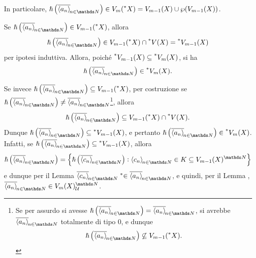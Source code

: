 {\begin{enumerate}
\begin{itemize}
\begin{itemize}
                In particolare, $ \hslash\left(\filtersequence{a_{n}}\right) \in V_{m}(\nonstandard{X}) = V_{m-1}(X)\cup \parti{V_{m-1}(X) } $. 

                Se $ \hslash\left(\filtersequence{a_{n}}\right) \in V_{m-1}(\nonstandard{X}) $, allora \begin{equation*}
                    \hslash\left(\filtersequence{a_{n}}\right) \in V_{m-1}(\nonstandard{X})\cap \nonstandard{V(X)} = \nonstandard{V_{m-1}(X) }
                \end{equation*}per ipotesi induttiva. Allora, poiché $ \prescript{*}{}{V_{m-1}(X) } \subseteq \prescript{*}{}{V_{m}(X) } $, si ha \begin{equation*}
                    \hslash\left(\filtersequence{a_{n}}\right) \in \nonstandard{V_{m}(X) }.
                \end{equation*}

                Se invece $ \hslash\left(\filtersequence{a_{n}}\right) \subseteq V_{m-1}(\nonstandard{X}) $, per costruzione se $ \hslash\left(\filtersequence{a_{n}}\right) \neq \filtersequence{a_{n}} $\footnote{Se per assurdo si avesse $ \hslash\left(\filtersequence{a_{n}}\right) = \filtersequence{a_{n}} $, si avrebbe $ \filtersequence{a_{n}} $ totalmente di tipo $ 0 $, e dunque \[\hslash\left(\filtersequence{a_{n}}\right) \not\subseteq V_{m-1}(\nonstandard{X}).\]}, allora \begin{equation*}
                    \hslash\left(\filtersequence{a_{n}}\right) \subseteq V_{m-1}(\nonstandard{X}) \cap \nonstandard{V(X)}.
                \end{equation*}Dunque $ \hslash\left(\filtersequence{a_{n}}\right) \subseteq \nonstandard{V_{m-1}}(X) $, e pertanto $ \hslash\left(\filtersequence{a_{n}}\right) \in \nonstandard{V_{m}(X) } $. Infatti, se $ \hslash\left(\filtersequence{a_{n}}\right) \subseteq \nonstandard{V_{m-1}}(X) $, allora \begin{equation*}
                    \hslash\left(\filtersequence{a_{n}}\right) = \set{\hslash\left(\filtersequence{c_{n}}\right): \sequence{c_{n}} \in K \subseteq V_{m-1}(X)^{\N} }
                \end{equation*}e dunque per il Lemma  $ \filtersequence{c_{n}} \mathrel{\nonstandard{\in}} \filtersequence{a_{n}} $, e quindi, per il Lemma , $ \filtersequence{a_{n}} \in V_{m}(X)^{\N}_{\mathcal{U}}  $.
            \end{itemize}
        \end{itemize} 


\end{enumerate}}
